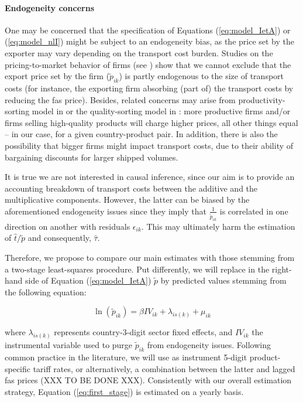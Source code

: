 \documentclass[a4paper,11pt]{article}
\begin{document}
\paragraph{Endogeneity concerns} One may be concerned that the specification of Equations (\ref{eq:model_IetA}) or (\ref{eq:model_nlI}) might be subject to an endogeneity bias, as the price set by the exporter may vary depending on the transport cost burden. Studies on the pricing-to-market behavior of firms (see \citealp{Krugman-87}) show that we cannot exclude that the export price set by the firm ($\widetilde{p}_{ik}$) is partly endogenous to the size of transport costs (for instance, the exporting firm absorbing (part of) the transport costs by reducing the fas price).
Besides, related concerns may arise from productivity-sorting model in \cite{melitz} or the quality-sorting model in \cite{baldwin_harrigan}: more productive firms and/or firms selling high-quality products will charge higher prices, all other things equal – in our case, for a given country-product pair. In addition, there is also the possibility that bigger firms might impact transport costs, due to their ability of bargaining discounts for larger shipped volumes.

It is true we are not interested in causal inference, since our aim is to provide an accounting breakdown of transport costs between the additive and the multiplicative components. However, the latter can be biased by the aforementioned endogeneity issues since they imply that $\frac{1}{\widetilde{p}_{ik}}$ is correlated in one direction on another with residuals $\epsilon_{ik}$. This may ultimately harm the estimation of $\widehat{t}/\widetilde{p}$ and consequently, $\widehat{\tau}$.

Therefore, we propose to compare our main estimates with those stemming from a two-stage least-squares procedure. Put differently, we will replace in the right-hand side of Equation (\ref{eq:model_IetA}) $\widetilde{p}$ by predicted values stemming from the following equation:

\begin{equation}
\ln\left(\widetilde{p}_{ik}\right)= \beta IV_{ik} +\lambda_{is(k)}+ \mu_{ik} \label{eq:first_stage}
\end{equation}

\noindent where $\lambda_{is(k)}$ represents country-3-digit sector fixed effects, and $IV_{ik} $ the instrumental variable used to purge $\widetilde{p}_{ik}$ from endogeneity issues. Following common practice in the literature, we will use as instrument 5-digit product-specific tariff rates, or alternatively, a combination between the latter and lagged fas prices (XXX TO BE DONE XXX). Consistently with our overall estimation strategy, Equation (\ref{eq:first_stage}) is estimated on a yearly basis.
\end{document}
